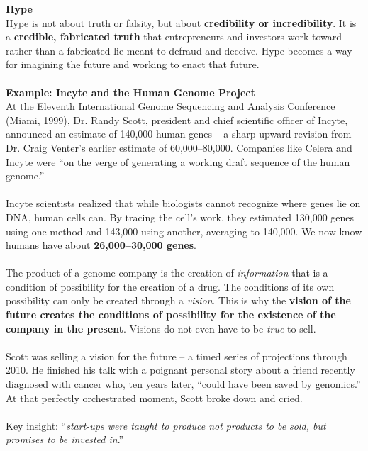 \documentclass[a4paper,12pt]{article}
\begin{document}
\noindent \textbf{Hype} \\
\noindent Hype is not about truth or falsity, but about \textbf{credibility or incredibility}. It is a \textbf{credible, fabricated truth} that entrepreneurs and investors work toward -- rather than a fabricated lie meant to defraud and deceive. Hype becomes a way for imagining the future and working to enact that future. \\
\\
\noindent \textbf{Example: Incyte and the Human Genome Project} \\
\noindent At the Eleventh International Genome Sequencing and Analysis Conference (Miami, 1999), Dr. Randy Scott, president and chief scientific officer of Incyte, announced an estimate of 140,000 human genes -- a sharp upward revision from Dr. Craig Venter's earlier estimate of 60,000--80,000. Companies like Celera and Incyte were ``on the verge of generating a working draft sequence of the human genome.'' \\
\\
\noindent Incyte scientists realized that while biologists cannot recognize where genes lie on DNA, human cells can. By tracing the cell's work, they estimated 130,000 genes using one method and 143,000 using another, averaging to 140,000. We now know humans have about \textbf{26,000--30,000 genes}. \\
\\
\noindent The product of a genome company is the creation of \emph{information} that is a condition of possibility for the creation of a drug. The conditions of its own possibility can only be created through a \emph{vision}. This is why the \textbf{vision of the future creates the conditions of possibility for the existence of the company in the present}. Visions do not even have to be \emph{true} to sell. \\
\\
\noindent Scott was selling a vision for the future -- a timed series of projections through 2010. He finished his talk with a poignant personal story about a friend recently diagnosed with cancer who, ten years later, ``could have been saved by genomics.'' At that perfectly orchestrated moment, Scott broke down and cried. \\
\\
\noindent Key insight: ``\emph{start-ups were taught to produce not products to be sold, but promises to be invested in}.'' \\
\end{document}
